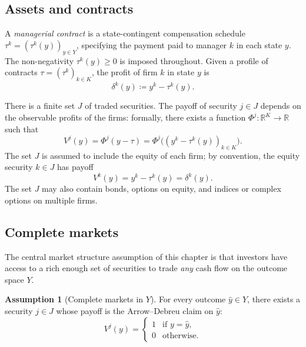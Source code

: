 \documentclass[11pt,a4paper,oneside]{book}
\def\R{\mathbb{R}}
\def\geq{\geqslant}
\theoremstyle{plain}
\theoremstyle{definition}
\newtheorem{assumption}[theorem]{Assumption}
\theoremstyle{remark}
\numberwithin{equation}{chapter}
\begin{document}
\subsection{Assets and contracts}

A \emph{managerial contract} is a state-contingent compensation schedule $\tau^k = (\tau^k(y))_{y \in Y}$, specifying the payment paid to manager $k$ in each state $y$.
The non-negativity $\tau^k(y) \geq 0$ is imposed throughout.
Given a profile of contracts $\tau = (\tau^k)_{k \in K}$, the profit of firm $k$ in state $y$ is
\begin{equation}\label{eq:MQ08-profit}
  \delta^k(y) \coloneqq y^k - \tau^k(y).
\end{equation}

There is a finite set $J$ of traded securities.
The payoff of security $j \in J$ depends on the observable profits of the firms: formally, there exists a function $\Phi^j : \R^K \to \R$ such that
\begin{equation}\label{eq:MQ08-security}
  V^j(y) = \Phi^j(y - \tau) = \Phi^j\bigl( (y^k - \tau^k(y))_{k \in K} \bigr).
\end{equation}
The set $J$ is assumed to include the equity of each firm; by convention, the equity security $k \in J$ has payoff
\begin{equation*}
  V^k(y) = y^k - \tau^k(y) = \delta^k(y).
\end{equation*}
The set $J$ may also contain bonds, options on equity, and indices or complex options on multiple firms.

\subsection{Complete markets}

The central market structure assumption of this chapter is that investors have access to a rich enough set of securities to trade \emph{any} cash flow on the outcome space $Y$.

\begin{assumption}[Complete markets in $Y$]\label{ass:MQ08-complete}
For every outcome $\widehat{y} \in Y$, there exists a security $j \in J$ whose payoff is the Arrow--Debreu claim on $\widehat{y}$:
\begin{equation*}
  V^j(y) = \begin{cases} 1 & \text{if } y = \widehat{y}, \\ 0 & \text{otherwise}. \end{cases}
\end{equation*}
\end{assumption}
\end{document}
